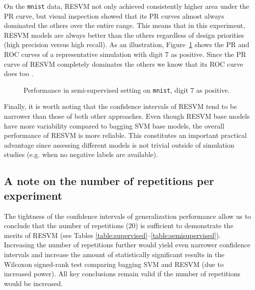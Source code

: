 On the \texttt{mnist} data, RESVM not only achieved consistently higher area under the PR curve, but visual inspection showed that its PR curves almost always dominated the others over the entire range. This means that in this experiment, RESVM models are always better than the others regardless of design priorities (high precision versus high recall). As an illustration, Figure~\ref{fig:curves} shows the PR and ROC curves of a representative simulation with digit 7 as positive. Since the PR curve of RESVM completely dominates the others we know that its ROC curve does too \citep{Davis:2006:RPR:1143844.1143874}. 

\begin{figure}%
\centering
{}\hfill
{}
  \caption{Performance in semi-supervised setting on \texttt{mnist}, digit $7$ as positive.} 
  \label{fig:curves}
\end{figure}


Finally, it is worth noting that the confidence intervals of RESVM tend to be narrower than those of both other approaches. Even though RESVM base models have more variability compared to bagging SVM base models, the overall performance of RESVM is more reliable. This constitutes an important practical advantage since assessing different models is not trivial outside of simulation studies (e.g. when no negative labels are available). 


\subsection{A note on the number of repetitions per experiment}
The tightness of the confidence intervals of generalization performance allow us to conclude that the number of repetitions (20) is sufficient to demonstrate the merits of RESVM (see Tables \ref{table:supervised}--\ref{table:semisupervised}). Increasing the number of repetitions further would yield even narrower confidence intervals and increase the amount of statistically significant results in the Wilcoxon signed-rank test comparing bagging SVM and RESVM (due to increased power). All key conclusions remain valid if the number of repetitions would be increased. 

